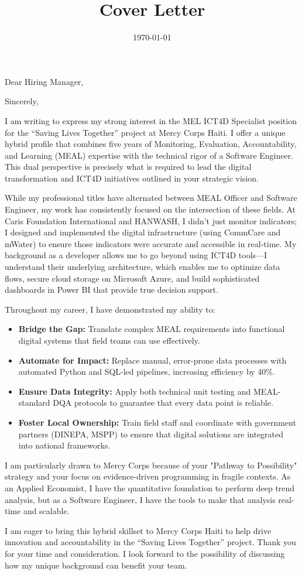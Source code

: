 \documentclass[11pt,a4paper,sans]{moderncv}
\title{Cover Letter}
\begin{document}
\date{\today}
\opening{Dear Hiring Manager,}
\closing{Sincerely,}

\makelettertitle

I am writing to express my strong interest in the MEL ICT4D Specialist position for the “Saving Lives Together” project at Mercy Corps Haiti. I offer a unique hybrid profile that combines five years of Monitoring, Evaluation, Accountability, and Learning (MEAL) expertise with the technical rigor of a Software Engineer. This dual perspective is precisely what is required to lead the digital transformation and ICT4D initiatives outlined in your strategic vision.

While my professional titles have alternated between MEAL Officer and Software Engineer, my work has consistently focused on the intersection of these fields. At Caris Foundation International and HANWASH, I didn't just monitor indicators; I designed and implemented the digital infrastructure (using CommCare and mWater) to ensure those indicators were accurate and accessible in real-time. My background as a developer allows me to go beyond using ICT4D tools—I understand their underlying architecture, which enables me to optimize data flows, secure cloud storage on Microsoft Azure, and build sophisticated dashboards in Power BI that provide true decision support.

Throughout my career, I have demonstrated my ability to:
\begin{itemize}
    \item \textbf{Bridge the Gap:} Translate complex MEAL requirements into functional digital systems that field teams can use effectively.
    \item \textbf{Automate for Impact:} Replace manual, error-prone data processes with automated Python and SQL-led pipelines, increasing efficiency by 40\%.
    \item \textbf{Ensure Data Integrity:} Apply both technical unit testing and MEAL-standard DQA protocols to guarantee that every data point is reliable.
    \item \textbf{Foster Local Ownership:} Train field staff and coordinate with government partners (DINEPA, MSPP) to ensure that digital solutions are integrated into national frameworks.
\end{itemize}

I am particularly drawn to Mercy Corps because of your "Pathway to Possibility" strategy and your focus on evidence-driven programming in fragile contexts. As an Applied Economist, I have the quantitative foundation to perform deep trend analysis, but as a Software Engineer, I have the tools to make that analysis real-time and scalable.

I am eager to bring this hybrid skillset to Mercy Corps Haiti to help drive innovation and accountability in the “Saving Lives Together” project. Thank you for your time and consideration. I look forward to the possibility of discussing how my unique background can benefit your team.

\makeletterclosing
\end{document}
